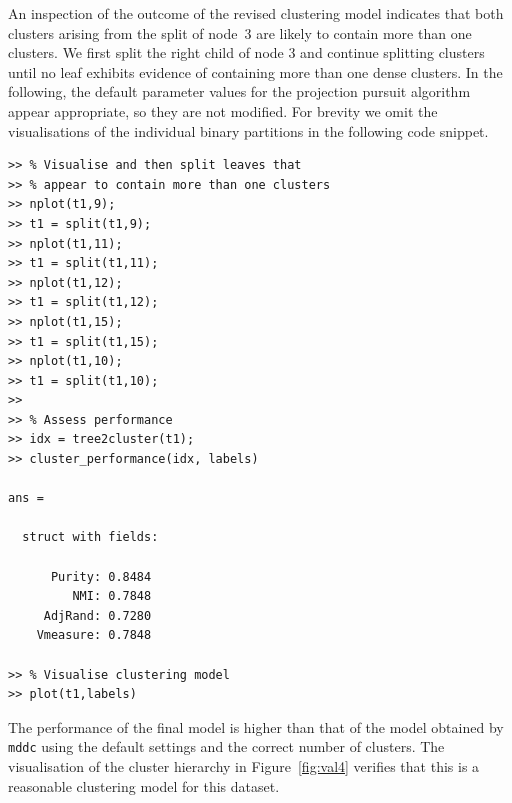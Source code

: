 \documentclass{book}
\begin{document}
An inspection of the outcome of the revised clustering model indicates that
both clusters arising from the split of node~3 are likely to contain more than
one clusters. We first split the right child of node 3 and continue splitting
clusters until no leaf exhibits evidence of containing more than one dense
clusters. In the following, the default parameter values for the projection
pursuit algorithm appear appropriate, so they are not modified.
%
For brevity we omit the visualisations of the individual binary partitions in
the following code snippet.


\begin{lstlisting}
>> % Visualise and then split leaves that 
>> % appear to contain more than one clusters
>> nplot(t1,9);
>> t1 = split(t1,9);
>> nplot(t1,11);
>> t1 = split(t1,11);
>> nplot(t1,12);
>> t1 = split(t1,12);
>> nplot(t1,15);
>> t1 = split(t1,15);
>> nplot(t1,10);
>> t1 = split(t1,10);
>>
>> % Assess performance
>> idx = tree2cluster(t1);
>> cluster_performance(idx, labels)

ans = 

  struct with fields:

      Purity: 0.8484
         NMI: 0.7848
     AdjRand: 0.7280
    Vmeasure: 0.7848

>> % Visualise clustering model
>> plot(t1,labels)
\end{lstlisting}



The performance of the final model is higher than that of the model obtained by
{\tt mddc} using the default settings and the correct number of clusters.
%
The visualisation of the cluster hierarchy in Figure~\ref{fig:val4} verifies
that this is a reasonable clustering model for this dataset.
\end{document}
